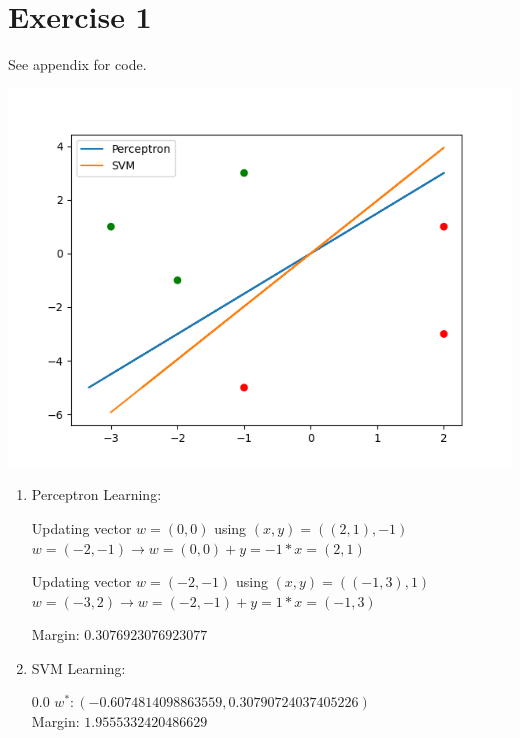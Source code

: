 \documentclass[12pt]{article}
\begin{document}
\section*{Exercise 1}
See \refname{appendix} for code.
\begin{center}
	\includegraphics{code/exercise_01.png}
\end{center}
\begin{enumerate}[label=(\alph*)]
	\item	Perceptron Learning: \\
			\bigskip

			Updating vector $w=(0, 0)$ using $(x,y)=((2, 1), -1)$ \\
			$w=(-2, -1) \rightarrow w=(0, 0) + y=-1 * x=(2, 1)$ \\
			\bigskip

			Updating vector $w=(-2, -1)$ using $(x,y)=((-1, 3), 1)$ \\
			$w=(-3, 2) \rightarrow w=(-2, -1) + y=1 * x=(-1, 3)$ \\
			\bigskip

			Margin: $0.3076923076923077$
	\item	SVM Learning: \\
			\bigskip

			0.0
			$w^*: (-0.6074814098863559, 0.30790724037405226)$ \\
			Margin: $1.9555332420486629$
\end{enumerate}
\end{document}

